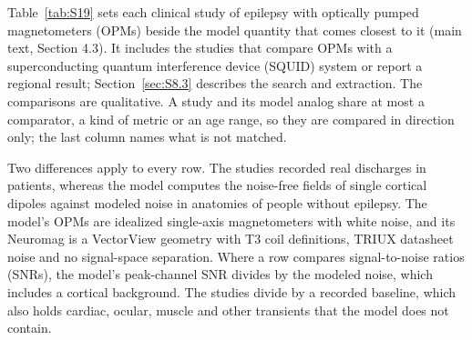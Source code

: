 \documentclass[preprint,12pt,authoryear,a4paper]{elsarticle}
\begin{document}
Table~\ref{tab:S19} sets each clinical study of epilepsy with optically pumped magnetometers (OPMs) beside the model quantity that comes closest to it (main text, Section 4.3). It includes the studies that compare OPMs with a superconducting quantum interference device (SQUID) system or report a regional result; Section~\ref{sec:S8.3} describes the search and extraction. The comparisons are qualitative. A study and its model analog share at most a comparator, a kind of metric or an age range, so they are compared in direction only; the last column names what is not matched.

Two differences apply to every row. The studies recorded real discharges in patients, whereas the model computes the noise-free fields of single cortical dipoles against modeled noise in anatomies of people without epilepsy. The model's OPMs are idealized single-axis magnetometers with white noise, and its Neuromag is a VectorView geometry with T3 coil definitions, TRIUX datasheet noise and no signal-space separation. Where a row compares signal-to-noise ratios (SNRs), the model's peak-channel SNR divides by the modeled noise, which includes a cortical background. The studies divide by a recorded baseline, which also holds cardiac, ocular, muscle and other transients that the model does not contain.
\end{document}
